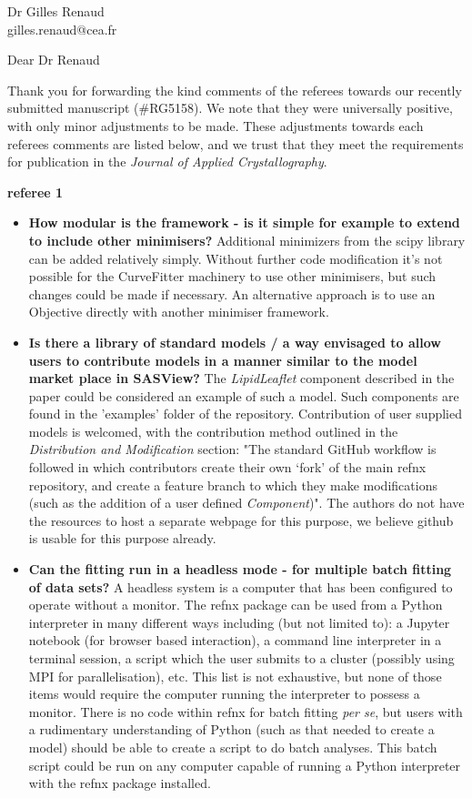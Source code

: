 \documentclass[fontsize=12pt, paper=a4]{scrlttr2}
\begin{document}
\begin{letter}{Dr Gilles Renaud \\ gilles.renaud@cea.fr}

\opening{Dear Dr Renaud}  %
Thank you for forwarding the kind comments of the referees towards our recently submitted manuscript (\#RG5158). We note that they were universally positive, with only minor adjustments to be made. These adjustments towards each referees comments are listed below, and we trust that they meet the requirements for publication in the \emph{Journal of Applied Crystallography}.


\textbf{referee 1}
\begin{itemize}
\item \textbf{How modular is the framework - is it simple for example to extend to include other minimisers?} Additional minimizers from the scipy library can be added relatively simply. Without further code modification it's not possible for the CurveFitter machinery to use other minimisers, but such changes could be made if necessary. An alternative approach is to use an Objective directly with another minimiser framework.
\item \textbf{Is there a library of standard models / a way envisaged to allow users to contribute models in a manner similar to the model market place in SASView?} The \emph{LipidLeaflet} component described in the paper could be considered an example of such a model. Such components are found in the 'examples' folder of the repository. Contribution of user supplied models is welcomed, with the contribution method outlined in the \emph{Distribution and Modification} section: "The standard GitHub workflow is followed in which contributors create their own `fork' of the main refnx repository, and create a feature branch to which they make modifications (such as the addition of a user defined \emph{Component})". The authors do not have the resources to host a separate webpage for this purpose, we believe github is usable for this purpose already.
\item \textbf{Can the fitting run in a headless mode - for multiple batch fitting of data sets?} A headless system is a computer that has been configured to operate without a monitor. The refnx package can be used from a Python interpreter in many different ways including (but not limited to): a Jupyter notebook (for browser based interaction), a command line interpreter in a terminal session, a script which the user submits to a cluster (possibly using MPI for parallelisation), etc. This list is not exhaustive, but none of those items would require the computer running the interpreter to possess a monitor. There is no code within refnx for batch fitting \emph{per se}, but users with a rudimentary understanding of Python (such as that needed to create a model) should be able to create a script to do batch analyses. This batch script could be run on any computer capable of running a Python interpreter with the refnx package installed.

\end{itemize}
\end{letter}
\end{document}
